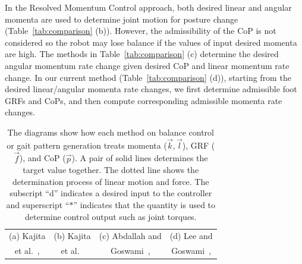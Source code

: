 \documentclass{llncs}
\newcommand{\vp}{\vec{p}}
\newcommand{\vk}{\vec{k}}
\newcommand{\vf}{\vec{f}}
\newcommand{\vl}{\vec{l}}
\begin{document}
In the Resolved Momentum Control approach\cite{KKKFHYH03},
both desired linear and angular momenta are used to determine
joint motion for posture change (Table~\ref{tab:comparison} (b)).
However, the admissibility of the CoP is not considered so the
robot may lose balance if the values of input desired momenta are high.
The methods in Table~\ref{tab:comparison} (c) determine
the desired angular momentum rate change given desired CoP and linear momentum rate change.
In our current method (Table~\ref{tab:comparison} (d)), starting
from the desired linear/angular momenta rate changes, we first determine
admissible foot GRFs and CoPs, and then compute corresponding admissible
momenta rate changes.

\begin{table}[h]
\begin{center}
\caption{The diagrams show how each method
on balance control or gait pattern generation
treats momenta ($\vk,\vl$), GRF ($\vf$),
and CoP ($\vp$). A pair of solid lines determines the target value together.
The dotted line shows the determination process of linear motion and force.
The subscript ``d'' indicates a desired input to the controller
and superscript ``$\ast$'' indicates that the quantity is used to determine control
output such as joint torques.}
\begin{tabular}{c|c|c|c}
\hline
{\scriptsize (a) Kajita } & {\scriptsize (b) Kajita } & {\scriptsize (c) Abdallah and }  & {\scriptsize (d) Lee and }  \\

{\scriptsize et al.~\cite{KKKYH01}, } & {\scriptsize et al.~\cite{KKKFHYH03}} & {\scriptsize Goswami~\cite{AG05},} & {\scriptsize Goswami~\cite{LeeGoswami10},}\\


\end{tabular}
\end{center}
\end{table}
\end{document}
